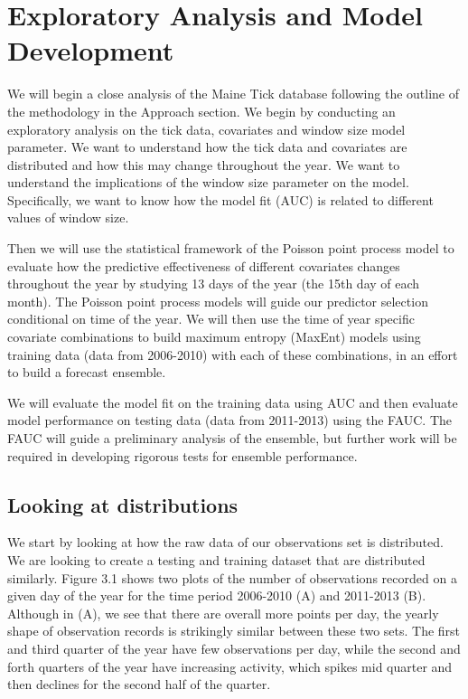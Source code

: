 
\chapter{Exploratory Analysis and Model Development} %

\label{Chapter2} %


We will begin a close analysis of the Maine Tick database following the outline of the methodology in the Approach section. We begin by conducting an exploratory analysis on the tick data, covariates and window size model parameter. We want to understand how the tick data and covariates are distributed and how this may change throughout the year. We want to understand the implications of the window size parameter on the model. Specifically, we want to know how the model fit (AUC) is related to different values of window size. \newline

\noindent Then we will use the statistical framework of the Poisson point process model to evaluate how the predictive effectiveness of different covariates changes throughout the year by studying 13 days of the year (the 15th day of each month). The Poisson point process models will guide our predictor selection conditional on time of the year. We will then use the time of year specific covariate combinations to build maximum entropy (MaxEnt) models using training data (data from 2006-2010) with each of these combinations, in an effort to build a forecast ensemble. \newline

\noindent We will evaluate the model fit on the training data using AUC and then evaluate model performance on testing data (data from 2011-2013) using the FAUC. The FAUC will guide a preliminary analysis of the ensemble, but further work will be required in developing rigorous tests for ensemble performance. 

\section{Looking at distributions }

We start by looking at how the raw data of our observations set is distributed. We are looking to create a testing and training dataset that are distributed similarly. Figure 3.1 shows two plots of the number of observations recorded on a given day of the year for the time period 2006-2010 (A) and 2011-2013 (B). Although in (A), we see that there are overall more points per day, the yearly shape of observation records is strikingly similar between these two sets. The first and third quarter of the year have few observations per day, while the second and forth quarters of the year have increasing activity, which spikes mid quarter and then declines for the second half of the quarter. \newline

